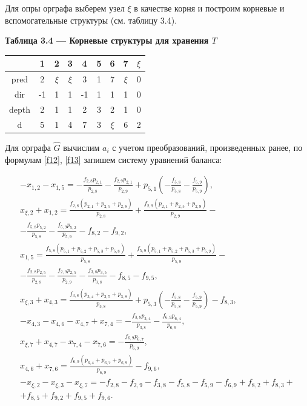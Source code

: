 \documentclass[14pt]{extarticle}%
\begin{document}
Для опры орграфа выберем узел $\xi$ в качестве корня и построим корневые и вспомогательные структуры (см. таблицу 3.4).
\newpage
\begin{center}
\textbf{Таблица 3.4 --- Корневые структуры для хранения $T$}\\
\begin{tabular}{c|cccccccc}
  &1&2&3&4&5&6&7&$\xi$\\\hline
 pred&2 & $\xi$ & $\xi$ & 3 & 1 & 7 & $\xi$ & 0 \\
 dir& -1 & 1 & 1 & -1 & 1 & 1 & 1 & 0 \\
 depth&2 & 1 & 1 & 2 & 3 & 2 & 1 & 0 \\
 d&5 & 1 & 4 & 7 & 3 & $\xi$ & 6 & 2 \\
\end{tabular}
\end{center}

Для орграфа $\widehat{G}$ вычислим $a_i$ с учетом преобразований, произведенных ранее, по формулам \eqref{f12}, \eqref{f13} запишем систему уравнений баланса:

\begin{equation}\begin{gathered}\label{f3.2.1}
-x_{1,2}-x_{1,5}=-\frac{f_{2,8} p_{2,1}}{p_{2,8}}-\frac{f_{2,9} p_{2,1}}{p_{2,9}}+p_{5,1} \left(-\frac{f_{5,8}}{p_{5,8}}-\frac{f_{5,9}}{p_{5,9}}\right),\\
    x_{\xi ,2}+x_{1,2}=\frac{f_{2,8} \left(p_{2,1}+p_{2,5}+p_{2,8}\right)}{p_{2,8}}+\frac{f_{2,9} \left(p_{2,1}+p_{2,5}+p_{2,9}\right)}{p_{2,9}}-\\-\frac{f_{5,8} p_{5,2}}{p_{5,8}}-\frac{f_{5,9} p_{5,2}}{p_{5,9}}-f_{8,2}-f_{9,2},\\
    x_{1,5}=\frac{f_{5,8} \left(p_{5,1}+p_{5,2}+p_{5,3}+p_{5,8}\right)}{p_{5,8}}+\frac{f_{5,9} \left(p_{5,1}+p_{5,2}+p_{5,3}+p_{5,9}\right)}{p_{5,9}}-\\-\frac{f_{2,8} p_{2,5}}{p_{2,8}}-\frac{f_{2,9} p_{2,5}}{p_{2,9}}-\frac{f_{3,8} p_{3,5}}{p_{3,8}}-f_{8,5}-f_{9,5},\\
    x_{\xi ,3}+x_{4,3}=\frac{f_{3,8} \left(p_{3,4}+p_{3,5}+p_{3,8}\right)}{p_{3,8}}+p_{5,3} \left(-\frac{f_{5,8}}{p_{5,8}}-\frac{f_{5,9}}{p_{5,9}}\right)-f_{8,3},\\
    -x_{4,3}-x_{4,6}-x_{4,7}+x_{7,4}=-\frac{f_{3,8} p_{3,4}}{p_{3,8}}-\frac{f_{6,9} p_{6,4}}{p_{6,9}},\\
    x_{\xi ,7}+x_{4,7}-x_{7,4}-x_{7,6}=-\frac{f_{6,9} p_{6,7}}{p_{6,9}},\\
    x_{4,6}+x_{7,6}=\frac{f_{6,9} \left(p_{6,4}+p_{6,7}+p_{6,9}\right)}{p_{6,9}}-f_{9,6},\\
    -x_{\xi ,2}-x_{\xi ,3}-x_{\xi ,7}=-f_{2,8}-f_{2,9}-f_{3,8}-f_{5,8}-f_{5,9}-f_{6,9}+f_{8,2}+f_{8,3}+\\+f_{8,5}+f_{9,2}+f_{9,5}+f_{9,6}.
    \end{gathered}
\end{equation}
\end{document}
